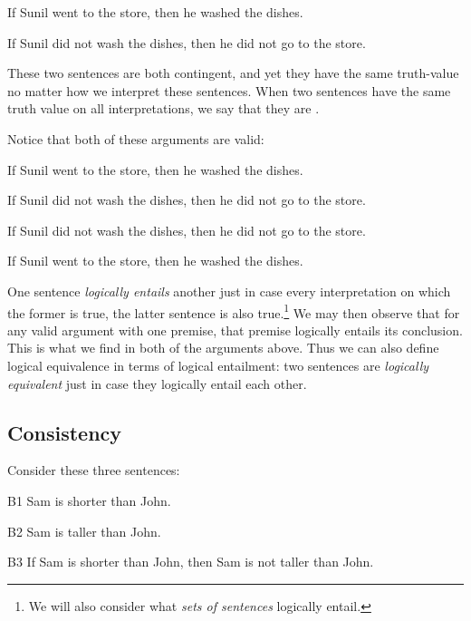 \begin{earg}
  \item[] If Sunil went to the store, then he washed the dishes.
  \item[] If Sunil did not wash the dishes, then he did not go to the store.
\end{earg}

These two sentences are both contingent, and yet they have the same truth-value no matter how we interpret these sentences.
When two sentences have the same truth value on all interpretations, we say that they are .

Notice that both of these arguments are valid:

\begin{earg}
  \item[] If Sunil went to the store, then he washed the dishes.
  \item[\therefore] If Sunil did not wash the dishes, then he did not go to the store.
\end{earg}

\begin{earg}
  \item[] If Sunil did not wash the dishes, then he did not go to the store.
  \item[\therefore] If Sunil went to the store, then he washed the dishes.
\end{earg}

One sentence \textit{logically entails} another just in case every interpretation on which the former is true, the latter sentence is also true.\footnote{We will also consider what \textit{sets of sentences} logically entail.}
We may then observe that for any valid argument with one premise, that premise logically entails its conclusion.
This is what we find in both of the arguments above.
Thus we can also define logical equivalence in terms of logical entailment: two sentences are \textit{logically equivalent} just in case they logically entail each other.




\subsection{Consistency}

Consider these three sentences:

\begin{ekey}
\item[B1] Sam is shorter than John.
\item[B2] Sam is taller than John. 
\item[B3] If Sam is shorter than John, then Sam is not taller than John.
\end{ekey}

